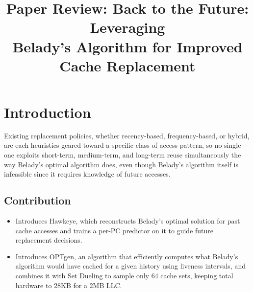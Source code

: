 \documentclass[10pt, conference]{IEEEtran}
\begin{document}
\title{\Large\bfseries Paper Review: Back to the Future: Leveraging\\Belady's Algorithm for Improved Cache Replacement}

\author{
}

\maketitle

\section{Introduction}
Existing replacement policies, whether recency-based, frequency-based, or hybrid, are each heuristics geared toward a specific class of access pattern, so no single one exploits short-term, medium-term, and long-term reuse simultaneously the way Belady's optimal algorithm does, even though Belady's algorithm itself is infeasible since it requires knowledge of future accesses.

\subsection{Contribution}
\begin{itemize}[leftmargin=*, itemsep=2pt, topsep=2pt, parsep=1pt]
    \item Introduces Hawkeye, which reconstructs Belady's optimal solution for past cache accesses and trains a per-PC predictor on it to guide future replacement decisions.
    \item Introduces OPTgen, an algorithm that efficiently computes what Belady's algorithm would have cached for a given history using liveness intervals, and combines it with Set Dueling to sample only 64 cache sets, keeping total hardware to 28KB for a 2MB LLC.
\end{itemize}

\end{document}
